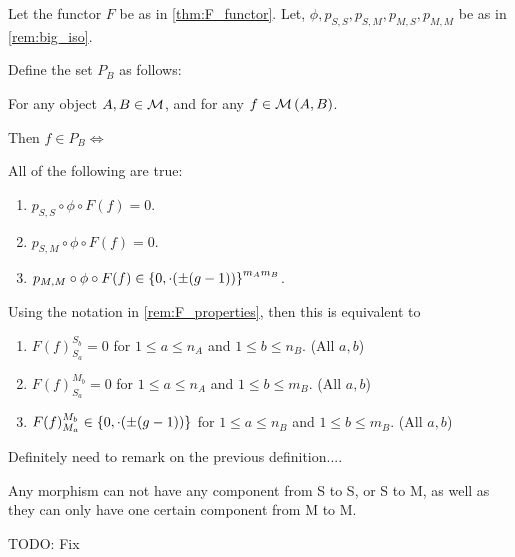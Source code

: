 \begin{definition} \label{def:unholy} %
    Let the functor \( F \) be as in \autoref{thm:F_functor}.  Let, \( \phi, p_{S, S}, p_{S, M}, p_{M, S}, p_{M, M} \) be as in \autoref{rem:big_iso}.

    Define the set \( P_B \) as follows:

    For any object \( A, B \in {\mathcal{M}} \), and for any \( f \in {\mathcal{M}}\left( A, B \right) \).

    Then \( f \in P_B \iff \)

    All of the following are true:
    \begin{enumerate}
        \item {
            \( p_{S, S} \circ \phi \circ F(f) = 0 \).
        }
        \item {
            \( p_{S, M} \circ \phi \circ F(f) = 0 \).
        }
        \item {
            \( p_{M, M} \circ \phi \circ F(f) \in \left\{ 0, \cdot(\pm (g - 1)) \right\}^{m_A m_B} \).
        }
    \end{enumerate}

    Using the notation in \autoref{rem:F_properties}, then this is equivalent to
    \begin{enumerate}
        \item \( F(f)_{S_a}^{S_b} = 0 \) for \( 1 \leq a \leq n_A \) and \( 1 \leq b \leq n_B \). (All \(a, b\))
        \item \( F(f)_{S_a}^{M_b} = 0 \) for \( 1 \leq a \leq n_A \) and \( 1 \leq b \leq m_B \). (All \(a, b\))
        \item \( F(f)_{M_a}^{M_b} \in \left\{ 0, \cdot(\pm (g - 1)) \right\} \) for \( 1 \leq a \leq n_B \) and \( 1 \leq b \leq m_B \). (All \(a, b\))
    \end{enumerate}
\end{definition}

\begin{remark}
    Definitely need to remark on the previous definition.... 
    
    Any morphism can not have any component from S to S, or S to M, as well as they can only have one certain component from M to M.

    TODO: Fix
\end{remark}

